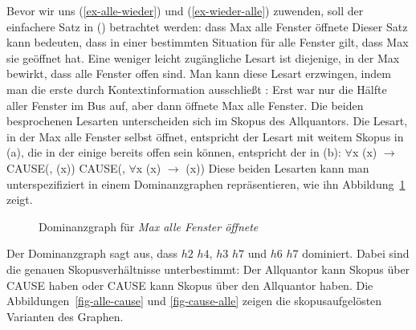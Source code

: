 Bevor wir uns (\ref{ex-alle-wieder}) und (\ref{ex-wieder-alle}) zuwenden, soll der einfachere Satz in () betrachtet werden:
\ea
dass Max alle Fenster öffnete
\z
Dieser Satz kann bedeuten, dass in einer bestimmten Situation für alle Fenster gilt, dass Max sie
geöffnet hat. Eine weniger leicht zugängliche Lesart ist diejenige, in der Max bewirkt, dass alle
Fenster offen sind. Man kann diese Lesart erzwingen, indem man die erste durch Kontextinformation
ausschließt \citep[]{Egg99a}:
\ea
Erst war nur die Hälfte aller Fenster im Bus auf, aber dann öffnete Max alle Fenster.
\z
Die beiden besprochenen Lesarten unterscheiden sich im Skopus des Allquantors. Die Lesart, in der
Max alle Fenster selbst öffnet, entspricht der Lesart mit weitem Skopus in
(a), die in der einige bereits offen sein können, entspricht der in (b):
\eal
\ex $\forall$x (x) $\to$ CAUSE(, (x))
\ex CAUSE(, $\forall$x (x) $\to$ (x))
\zl
Diese beiden Lesarten kann man unterspezifiziert in einem Dominanzgraphen repräsentieren, wie ihn
Abbildung~\ref{Abbildung-Max-alle-Fenster-oeffnete} zeigt.
\begin{figure}
\caption{Dominanzgraph für \emph{Max alle Fenster öffnete}\label{Abbildung-Max-alle-Fenster-oeffnete}}
\end{figure}
Der Dominanzgraph sagt aus, dass $h2$ $h4$, $h3$ $h7$ und $h6$ $h7$ dominiert. Dabei sind die genauen Skopusverhältnisse unterbestimmt: Der
Allquantor kann Skopus über CAUSE haben oder CAUSE kann Skopus über den Allquantor haben. Die
Abbildungen~\ref{fig-alle-cause} und \ref{fig-cause-alle} zeigen die skopusaufgelösten Varianten des
Graphen.
